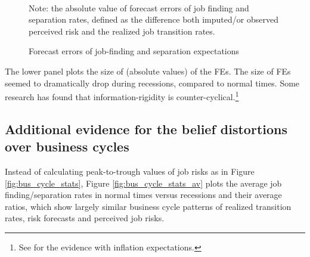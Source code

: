    
\begin{figure}[ht]
\caption{Forecast errors of job-finding and separation expectations}
\label{fig:forecast_errors}    
     	\begin{center}
    	 \\
 \end{center}
 \begin{flushleft}\footnotesize{Note: the absolute value of forecast errors of job finding and separation rates, defined as the difference both imputed/or observed perceived risk and the realized job transition rates.} \end{flushleft}
\end{figure}
    
    The lower panel plots the size of (absolute values) of the FEs. The size of FEs seemed to dramatically drop during recessions, compared to normal times. Some research has found that information-rigidity is counter-cyclical.\footnote{See \cite{coibion2015information} for the evidence with inflation expectations.}


\subsection{Additional evidence for the belief distortions over business cycles}

Instead of calculating peak-to-trough values of job risks as in Figure \ref{fig:bus_cycle_stats},  Figure \ref{fig:bus_cycle_stats_av} plots the average job finding/separation rates in normal times versus recessions and their average ratios, which show largely similar business cycle patterns of realized transition rates, risk forecasts and perceived job risks. 

